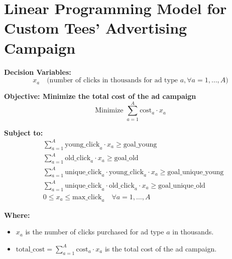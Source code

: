 \documentclass{article}
\begin{document}
\section*{Linear Programming Model for Custom Tees' Advertising Campaign}

\textbf{Decision Variables:}
\[
x_a \quad \text{(number of clicks in thousands for ad type } a, \forall a = 1, \ldots, A)
\]

\textbf{Objective: Minimize the total cost of the ad campaign}
\[
\text{Minimize } \sum_{a=1}^{A} \text{cost}_a \cdot x_a
\]

\textbf{Subject to:}
\begin{align*}
& \sum_{a=1}^{A} \text{young\_click}_{a} \cdot x_a \geq \text{goal\_young} \\
& \sum_{a=1}^{A} \text{old\_click}_{a} \cdot x_a \geq \text{goal\_old} \\
& \sum_{a=1}^{A} \text{unique\_click}_{a} \cdot \text{young\_click}_{a} \cdot x_a \geq \text{goal\_unique\_young} \\
& \sum_{a=1}^{A} \text{unique\_click}_{a} \cdot \text{old\_click}_{a} \cdot x_a \geq \text{goal\_unique\_old} \\
& 0 \leq x_a \leq \text{max\_click}_{a} \quad \forall a = 1, \ldots, A
\end{align*}

\textbf{Where:}
\begin{itemize}
    \item \( x_a \) is the number of clicks purchased for ad type \( a \) in thousands.
    \item \( \text{total\_cost} = \sum_{a=1}^{A} \text{cost}_a \cdot x_a \) is the total cost of the ad campaign.
\end{itemize}
\end{document}
